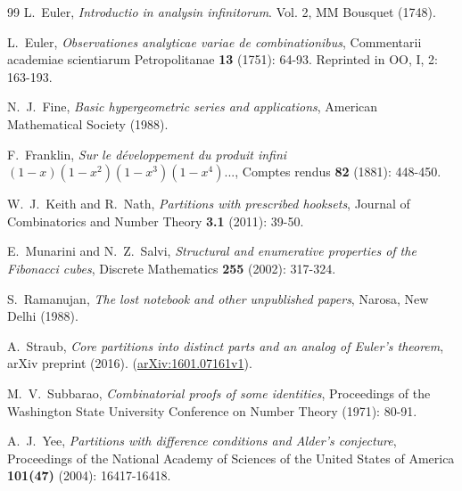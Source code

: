 \documentclass[12pt]{amsart}
\numberwithin{equation}{section}
\theoremstyle{plain}
\theoremstyle{definition}
\begin{document}
\begin{thebibliography}{99}
L.~Euler, \emph{Introductio in analysin infinitorum}. Vol. 2, MM Bousquet (1748).

L.~Euler, \emph{Observationes analyticae variae de combinationibus}, Commentarii academiae scientiarum Petropolitanae {\bf 13} (1751): 64-93. Reprinted in OO, I, 2: 163-193.

N.~J.~Fine, \emph{Basic hypergeometric series and applications}, American Mathematical Society (1988).

F.~Franklin, \emph{Sur le d\'{e}veloppement du produit infini $(1-x)(1-x^2)(1-x^3)(1-x^4)...$}, Comptes rendus {\bf 82} (1881): 448-450.

W.~J.~Keith and R.~Nath, \emph{Partitions with prescribed hooksets}, Journal of Combinatorics and Number Theory {\bf 3.1} (2011): 39-50.

E.~Munarini and N.~Z.~Salvi, \emph{Structural and enumerative properties of the Fibonacci cubes}, Discrete Mathematics {\bf 255} (2002): 317-324.


S.~Ramanujan, \emph{The lost notebook and other unpublished papers}, Narosa, New Delhi (1988).

A.~Straub, \emph{Core partitions into distinct parts and an analog of Euler's theorem}, arXiv preprint (2016). (\href{http://arxiv.org/abs/1601.07161v1}{arXiv:1601.07161v1}).

M.~V.~Subbarao, \emph{Combinatorial proofs of some identities}, Proceedings of the Washington State University Conference on Number Theory (1971): 80-91.
%

A.~J.~Yee, \emph{Partitions with difference conditions and Alder's conjecture}, Proceedings of the National Academy of Sciences of the United States of America {\bf 101(47)} (2004): 16417-16418.

\end{thebibliography}
\end{document}
